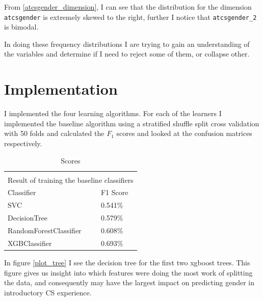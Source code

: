 From \ref{atcsgender_dimension}, I can see that the distribution for the dimension \texttt{atcsgender} is extremely skewed to the right, further I notice that \texttt{atcsgender\_2} is bimodal. 

In doing these frequency distributions I are trying to gain an understanding of the variables and determine if I need to reject some of them, or collapse other.




\section*{Implementation}
I implemented the four learning algorithms. For each of the learners I implemented the baseline algorithm using a stratified shuffle split cross validation with 50 folds and calculated the $F_1$ scores and looked at the confusion matrices respectively. 


\setlength{\extrarowheight}{1.5pt}
\begin{table}[!htbp]
\caption{Scores} %
\centering %
\begin{tabular}{|p{6cm}|p{1.5cm}|} %
\hline %


\multicolumn{2}{|c|}{}\\
\multicolumn{2}{|c|}{Result of training the baseline classifiers}\\[5pt]
\hline
Classifier & F1 Score\\[0.5ex]
\hline %

SVC     & 0.541\% \\
DecisionTree       & 0.579\% \\
RandomForestClassifier   & 0.608\% \\
XGBClassifier            & 0.693\% \\

\hline%
\end{tabular}
\label{tableBenchMarkScores}
\end{table}

In figure \ref{plot_tree} I see the decision tree for the first two xgboost trees. This figure gives us insight into which features were doing the most work of splitting the data, and consequently may have the largest impact on predicting gender in introductory CS experience.


